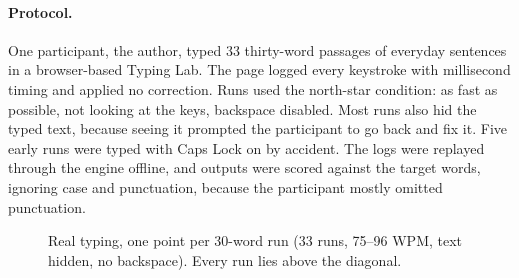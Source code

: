\documentclass[11pt,a4paper]{article}
\newcommand{\qk}{QuipKeys}
\begin{document}
\paragraph{Protocol.} One participant, the author, typed 33 thirty-word passages of everyday sentences in a browser-based Typing Lab. The page logged every keystroke with millisecond timing and applied no correction. Runs used the north-star condition: as fast as possible, not looking at the keys, backspace disabled. Most runs also hid the typed text, because seeing it prompted the participant to go back and fix it. Five early runs were typed with Caps Lock on by accident. The logs were replayed through the engine offline, and outputs were scored against the target words, ignoring case and punctuation, because the participant mostly omitted punctuation.

\begin{figure}[t]
\centering
{}
\caption{Real typing, one point per 30-word run (33 runs, 75--96 WPM, text hidden, no backspace). Every run lies above the diagonal.}
\label{fig:real}
\end{figure}
\end{document}

